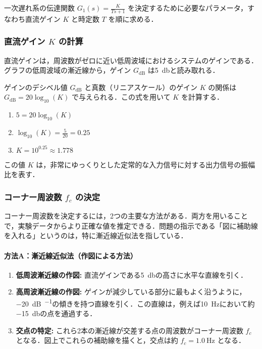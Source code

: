 \documentclass[11pt,a4paper]{ltjsarticle}
\newcommand{\supcite}[1]{\textsuperscript{\cite{#1}}}
\begin{document}
一次遅れ系の伝達関数 $G_1(s) = \frac{K}{Ts+1}$ を決定するために必要なパラメータ，すなわち直流ゲイン $K$ と時定数 $T$ を順に求める．

\subsubsection{直流ゲイン $K$ の計算}

直流ゲインは，周波数がゼロに近い低周波域におけるシステムのゲインである．グラフの低周波域の漸近線から，ゲイン $G_{\text{dB}}$ は\SI{5}{\decibel}と読み取れる\supcite{ref1}．

ゲインのデシベル値 $G_{\text{dB}}$ と真数（リニアスケール）のゲイン $K$ の関係は $G_{\text{dB}} = 20\log_{10}(K)$ で与えられる\supcite{ref4}．この式を用いて $K$ を計算する．
\begin{enumerate}
    \item $5 = 20\log_{10}(K)$
    \item $\log_{10}(K) = \frac{5}{20} = 0.25$
    \item $K = 10^{0.25} \approx 1.778$
\end{enumerate}
この値 $K$ は，非常にゆっくりとした定常的な入力信号に対する出力信号の振幅比を表す．

\subsubsection{コーナー周波数 \texorpdfstring{$f_c$}{fc} の決定}

コーナー周波数を決定するには，2つの主要な方法がある．両方を用いることで，実験データからより正確な値を推定できる．問題の指示である「図に補助線を入れる」というのは，特に漸近線近似法を指している\supcite{ref1}．

\paragraph{方法A：漸近線近似法（作図による方法）}
\begin{enumerate}
    \item \textbf{低周波漸近線の作図:} 直流ゲインである\SI{+5}{\decibel}の高さに水平な直線を引く．
    \item \textbf{高周波漸近線の作図:} ゲインが減少している部分に最もよく沿うように，\SI{-20}{\dB\per\decade}の傾きを持つ直線を引く．この直線は，例えば\SI{10}{\hertz}において約\SI{-15}{\decibel}の点を通過する．
    \item \textbf{交点の特定:} これら2本の漸近線が交差する点の周波数がコーナー周波数 $f_c$ となる．図上でこれらの補助線を描くと，交点は約 $f_c = \SI{1.0}{\hertz}$ となる．
\end{enumerate}
\end{document}
